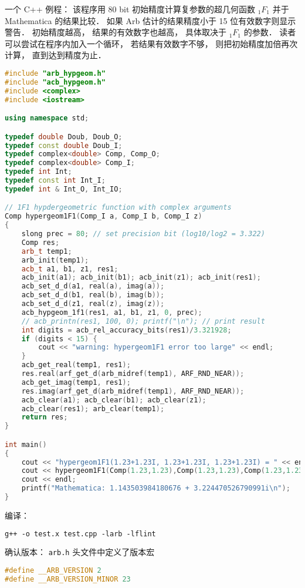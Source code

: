 一个 C++ 例程： 该程序用 80 bit 初始精度计算复参数的超几何函数 $_1F_1$ 并于 Mathematica 的结果比较． 如果 Arb 估计的结果精度小于 15 位有效数字则显示警告． 初始精度越高， 结果的有效数字也越高， 具体取决于 $_1F_1$ 的参数． 读者可以尝试在程序内加入一个循环， 若结果有效数字不够， 则把初始精度加倍再次计算， 直到达到精度为止．

\begin{lstlisting}[language=cpp, caption=test.cpp]
#include "arb_hypgeom.h"
#include "acb_hypgeom.h"
#include <complex>
#include <iostream>

using namespace std;

typedef double Doub, Doub_O;
typedef const double Doub_I;
typedef complex<double> Comp, Comp_O;
typedef complex<double> Comp_I;
typedef int Int;
typedef const int Int_I;
typedef int & Int_O, Int_IO;

// 1F1 hypdergeometric function with complex arguments
Comp hypergeom1F1(Comp_I a, Comp_I b, Comp_I z)
{
	slong prec = 80; // set precision bit (log10/log2 = 3.322)
	Comp res;
	arb_t temp1;
	arb_init(temp1);
	acb_t a1, b1, z1, res1;
	acb_init(a1); acb_init(b1); acb_init(z1); acb_init(res1);
	acb_set_d_d(a1, real(a), imag(a));
	acb_set_d_d(b1, real(b), imag(b));
	acb_set_d_d(z1, real(z), imag(z));
	acb_hypgeom_1f1(res1, a1, b1, z1, 0, prec);
	// acb_printn(res1, 100, 0); printf("\n"); // print result
	int digits = acb_rel_accuracy_bits(res1)/3.321928;
	if (digits < 15) {
		cout << "warning: hypergeom1F1 error too large" << endl;
	}
	acb_get_real(temp1, res1);
	res.real(arf_get_d(arb_midref(temp1), ARF_RND_NEAR));
	acb_get_imag(temp1, res1);
	res.imag(arf_get_d(arb_midref(temp1), ARF_RND_NEAR));
	acb_clear(a1); acb_clear(b1); acb_clear(z1);
    acb_clear(res1); arb_clear(temp1);
	return res;
}

int main()
{
	cout << "hypergeom1F1(1.23+1.23I, 1.23+1.23I, 1.23+1.23I) = " << endl;
	cout << hypergeom1F1(Comp(1.23,1.23),Comp(1.23,1.23),Comp(1.23,1.23))
    cout << endl;
	printf("Mathematica: 1.143503984180676 + 3.224470526790991i\n");
}
\end{lstlisting}
编译：
\begin{lstlisting}[language=makefile]
g++ -o test.x test.cpp -larb -lflint
\end{lstlisting}

确认版本： \verb|arb.h| 头文件中定义了版本宏
\begin{lstlisting}[language=cpp]
#define __ARB_VERSION 2
#define __ARB_VERSION_MINOR 23
\end{lstlisting}

